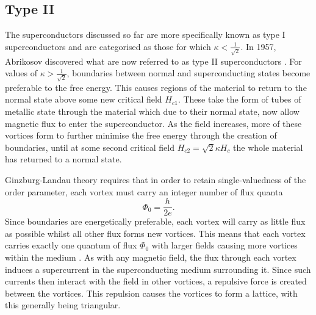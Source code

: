 \documentclass{article}
\numberwithin{equation}{section}
\begin{document}
\subsection{Type II}
The superconductors discussed so far are more specifically known as type I superconductors and are categorised as those for which $\kappa < \frac{1}{\sqrt{2}}$. In 1957, Abrikosov discovered what are now referred to as type II superconductors \cite{Abrikosov1957TheAlloys}. For values of $\kappa > \frac{1}{\sqrt{2}}$, boundaries between normal and superconducting states become preferable to the free energy. This causes regions of the material to return to the normal state above some new critical field $H_{c1}$. These take the form of tubes of metallic state through the material which due to their normal state, now allow magnetic flux to enter the superconductor. As the field increases, more of these vortices form to further minimise the free energy through the creation of boundaries, until at some second critical field $H_{c2} = \sqrt{2}\kappa H_c$ the whole material has returned to a normal state.

Ginzburg-Landau theory requires that in order to retain single-valuedness of the order parameter, each vortex must carry an integer number of flux quanta
\begin{equation}
    \Phi_0 = \frac{h}{2e}.
\end{equation}
Since boundaries are energetically preferable, each vortex will carry as little flux as possible whilst all other flux forms new vortices. This means that each vortex carries exactly one quantum of flux $\Phi_0$ with larger fields causing more vortices within the medium \cite{Poole2014Superconductivity}. As with any magnetic field, the flux through each vortex induces a supercurrent in the superconducting medium surrounding it. Since such currents then interact with the field in other vortices, a repulsive force is created between the vortices. This repulsion causes the vortices to form a lattice, with this generally being triangular.
\end{document}
